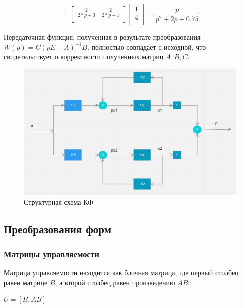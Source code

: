 \documentclass[14pt,a4paper,report]{report}
\begin{document}
\begin{equation*}
\text{$=\begin{bmatrix}
	\frac{2}{2*p + 3} & \frac{2}{2*p + 1} \\
	\end{bmatrix}\begin{bmatrix}
	1 \\
	4 \\
	\end{bmatrix}=\frac{p}{p^2+2p+0.75}
	$}
\end{equation*}

Передаточная функция, полученная в результате преобразования $W(p)=C(pE-A)^{-1}B$, полностью совпадает с исходной, что свидетельствует о корректности полученных матриц  $A, B, C$. 


\begin{figure}[h!]
	\centering
	\includegraphics[scale = 0.67]{images/kf.jpg}
	\caption{Структурная схема КФ}
	\label{image:3}
\end{figure}

\subsection{Преобразования форм}

\subsubsection{Матрицы управляемости}

Матрица управляемости находится как блочная матрица, где первый столбец равен матрице $B$, а второй столбец равен произведению $AB$:

\begin{center}
$U=[B, AB]$
\end{center}
\end{document}
